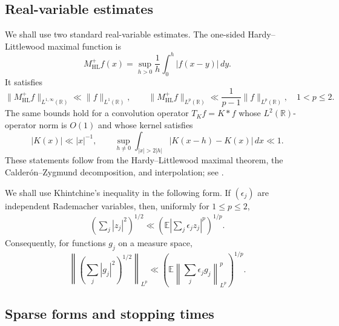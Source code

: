 \documentclass[12pt,reqno]{amsart}
\numberwithin{equation}{section}
\theoremstyle{definition}
\theoremstyle{remark}
\begin{document}
\subsection{Real-variable estimates}

We shall use two standard real-variable estimates.  The one-sided
Hardy--Littlewood maximal function is
\[
 M_{\mathrm{HL}}^+f(x)
 =
 \sup_{h>0}\frac1h\int_0^h|f(x-y)|\,dy.
\]
It satisfies
\[
 \|M_{\mathrm{HL}}^+f\|_{L^{1,\infty}(\mathbb R)}
 \ll\|f\|_{L^1(\mathbb R)},
 \qquad
 \|M_{\mathrm{HL}}^+f\|_{L^p(\mathbb R)}
 \ll\frac1{p-1}\|f\|_{L^p(\mathbb R)},
 \quad 1<p\leq2.
\]
The same bounds hold for a convolution operator \(T_Kf=K*f\)
whose \(L^2(\mathbb R)\)-operator norm is \(O(1)\) and whose
kernel satisfies
\[
 |K(x)|\ll |x|^{-1},
 \qquad
 \sup_{h\neq0}\int_{|x|>2|h|}
 |K(x-h)-K(x)|\,dx\ll1.
\]
These statements follow from the Hardy--Littlewood maximal theorem,
the Calderón--Zygmund decomposition, and interpolation; see
\cite[Chapter~I, Sections~3--4]{SteinHA}.

We shall use Khintchine's inequality in the following form.  If
\((\epsilon_j)\) are independent Rademacher variables, then, uniformly
for \(1\leq p\leq2\),
\begin{align}\label{e:khintchine}
 \left(\sum_j|z_j|^2\right)^{1/2}
 \ll
 \left(\mathbb E\left|
 \sum_j\epsilon_jz_j\right|^p\right)^{1/p}.
\end{align}
Consequently, for functions \(g_j\) on a measure space,
\[
 \left\|\left(\sum_j|g_j|^2\right)^{1/2}\right\|_{L^p}
 \ll
 \left(
 \mathbb E\left\|\sum_j\epsilon_jg_j\right\|_{L^p}^p
 \right)^{1/p}.
\]



\subsection{Sparse forms and stopping times}
\end{document}
